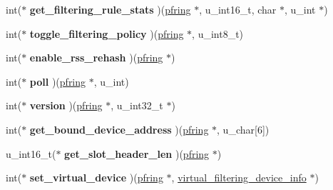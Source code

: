 \begin{DoxyCompactItemize}
\item 
\hypertarget{struct____pfring_ab737c410d8cad49fa6d2ede1344b4a4f}{
int($\ast$ {\bfseries get\_\-filtering\_\-rule\_\-stats} )(\hyperlink{struct____pfring}{pfring} $\ast$, u\_\-int16\_\-t, char $\ast$, u\_\-int $\ast$)}
\label{struct____pfring_ab737c410d8cad49fa6d2ede1344b4a4f}

\item 
\hypertarget{struct____pfring_a08c3dc9e5f9065e97cff3e634d2f3686}{
int($\ast$ {\bfseries toggle\_\-filtering\_\-policy} )(\hyperlink{struct____pfring}{pfring} $\ast$, u\_\-int8\_\-t)}
\label{struct____pfring_a08c3dc9e5f9065e97cff3e634d2f3686}

\item 
\hypertarget{struct____pfring_ace7b04d2d1585d57ad25b04d0abc70b2}{
int($\ast$ {\bfseries enable\_\-rss\_\-rehash} )(\hyperlink{struct____pfring}{pfring} $\ast$)}
\label{struct____pfring_ace7b04d2d1585d57ad25b04d0abc70b2}

\item 
\hypertarget{struct____pfring_a8e109e79ac51ac96e301bcbb1806ffa4}{
int($\ast$ {\bfseries poll} )(\hyperlink{struct____pfring}{pfring} $\ast$, u\_\-int)}
\label{struct____pfring_a8e109e79ac51ac96e301bcbb1806ffa4}

\item 
\hypertarget{struct____pfring_a63e55da44e33df592a6408eada6f6c7a}{
int($\ast$ {\bfseries version} )(\hyperlink{struct____pfring}{pfring} $\ast$, u\_\-int32\_\-t $\ast$)}
\label{struct____pfring_a63e55da44e33df592a6408eada6f6c7a}

\item 
\hypertarget{struct____pfring_a5f7c21bef0402f08b1687d179892d954}{
int($\ast$ {\bfseries get\_\-bound\_\-device\_\-address} )(\hyperlink{struct____pfring}{pfring} $\ast$, u\_\-char\mbox{[}6\mbox{]})}
\label{struct____pfring_a5f7c21bef0402f08b1687d179892d954}

\item 
\hypertarget{struct____pfring_a60e3506755227a1164b291e2a1fdb11f}{
u\_\-int16\_\-t($\ast$ {\bfseries get\_\-slot\_\-header\_\-len} )(\hyperlink{struct____pfring}{pfring} $\ast$)}
\label{struct____pfring_a60e3506755227a1164b291e2a1fdb11f}

\item 
\hypertarget{struct____pfring_a6f90a981853c68c7081309cbe0823f3d}{
int($\ast$ {\bfseries set\_\-virtual\_\-device} )(\hyperlink{struct____pfring}{pfring} $\ast$, \hyperlink{structvirtual__filtering__device__info}{virtual\_\-filtering\_\-device\_\-info} $\ast$)}
\label{struct____pfring_a6f90a981853c68c7081309cbe0823f3d}


\end{DoxyCompactItemize}
